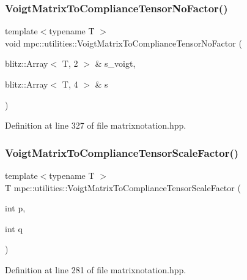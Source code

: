 \subsubsection{\texorpdfstring{Voigt\+Matrix\+To\+Compliance\+Tensor\+No\+Factor()}{VoigtMatrixToComplianceTensorNoFactor()}}
{\footnotesize\ttfamily template$<$typename T $>$ \\
void mpc\+::utilities\+::\+Voigt\+Matrix\+To\+Compliance\+Tensor\+No\+Factor (\begin{DoxyParamCaption}\item[{blitz\+::\+Array$<$ T, 2 $>$ \&}]{s\+\_\+voigt,  }\item[{blitz\+::\+Array$<$ T, 4 $>$ \&}]{s }\end{DoxyParamCaption})}



Definition at line 327 of file matrixnotation.\+hpp.

\mbox{\label{namespacempc_1_1utilities_afd7cbb4c9bcff1896e7151eae95369ae}} 
\subsubsection{\texorpdfstring{Voigt\+Matrix\+To\+Compliance\+Tensor\+Scale\+Factor()}{VoigtMatrixToComplianceTensorScaleFactor()}}
{\footnotesize\ttfamily template$<$typename T $>$ \\
T mpc\+::utilities\+::\+Voigt\+Matrix\+To\+Compliance\+Tensor\+Scale\+Factor (\begin{DoxyParamCaption}\item[{int}]{p,  }\item[{int}]{q }\end{DoxyParamCaption})}



Definition at line 281 of file matrixnotation.\+hpp.

\mbox{\label{namespacempc_1_1utilities_ad181e7080d74d1e523e872bc8ff53f5e}} 
